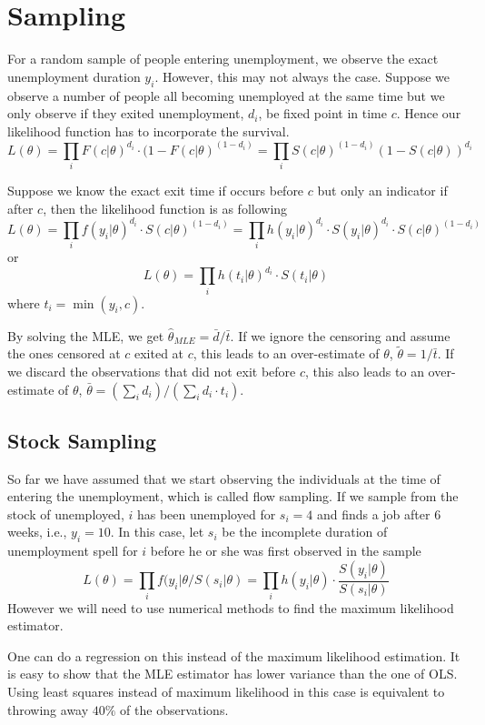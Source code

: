 \documentclass[11pt, a4paper, oneside]{article}
\theoremstyle{definition}
\theoremstyle{proposition}
\theoremstyle{corollary}
\theoremstyle{lemma}
\theoremstyle{theorem}
\begin{document}
\section{Sampling}
For a random sample of people entering unemployment, we observe the exact unemployment duration $y_i$. However, this may not always the case. Suppose we observe a number of people all becoming unemployed at the same time but we only observe if they exited unemployment, $d_i$, be fixed point in time $c$. Hence our likelihood function has to incorporate the survival. 
$$L(\theta) = \prod_i F(c|\theta)^{d_i}\cdot (1 - F(c|\theta)^{(1-d_i)} = \prod_i S(c|\theta)^{(1-d_i)}(1- S(c|\theta))^{d_i}$$

Suppose we know the exact exit time if occurs before $c$ but only an indicator if after $c$, then the likelihood function is as following
$$L(\theta) = \prod_i f(y_i|\theta)^{d_i}\cdot S(c|\theta)^{(1- d_i)} = \prod_i h(y_i|\theta)^{d_i}\cdot S(y_i|\theta)^{d_i}\cdot S(c|\theta)^{(1- d_i)}$$
or
$$L(\theta) = \prod_i h(t_i|\theta)^{d_i}\cdot S(t_i|\theta)$$ where $t_i = \min(y_i, c)$. 

By solving the MLE, we get $\hat{\theta}_{MLE} = \bar{d}/\bar{t}$. If we ignore the censoring and assume the ones censored at $c$ exited at $c$, this leads to an over-estimate of $\theta$, $\tilde{\theta} = 1/\bar{t}$. If we discard the observations that did not exit before $c$, this also leads to an over-estimate of $\theta$, $\bar{\theta} = (\sum_i d_i)/(\sum_i d_i \cdot t_i)$. 

\subsection{Stock Sampling}
So far we have assumed that we start observing the individuals at the time of entering the unemployment, which is called flow sampling. If we sample from the stock of unemployed, $i$ has been unemployed for $s_i =4$ and finds a job after 6 weeks, i.e., $y_i=10$. In this case, let $s_i$ be the incomplete duration of unemployment spell for $i$ before he or she was first observed in the sample
$$L(\theta) = \prod_i f(y_i|\theta/S(s_i|\theta) = \prod_i h(y_i|\theta)\cdot \frac{S(y_i|\theta)}{S(s_i|\theta)}$$
However we will need to use numerical methods to find the maximum likelihood estimator. 

One can do a regression on this instead of the maximum likelihood estimation. It is easy to show that the MLE estimator has lower variance than the one of OLS. Using least squares instead of maximum likelihood in this case is equivalent to throwing away $40\%$ of the observations. 
\end{document}
